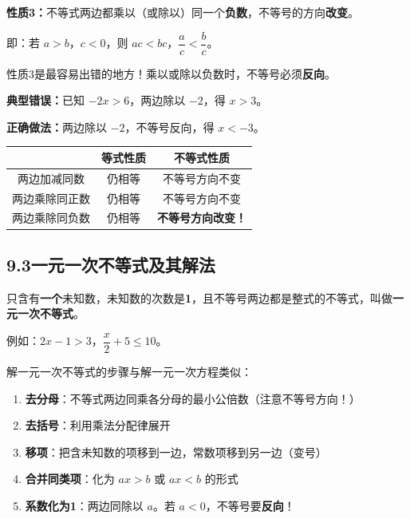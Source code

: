 \documentclass[12pt, a4paper]{ctexart}
\begin{document}
\begin{knowledgebox}[9.2.3 不等式的基本性质3]
\textbf{性质3：}不等式两边都乘以（或除以）同一个\textbf{负数}，不等号的方向\textbf{改变}。

即：若 $a > b$，$c < 0$，则 $ac < bc$，$\dfrac{a}{c} < \dfrac{b}{c}$。
\end{knowledgebox}

\begin{warnbox}[易错提醒：性质3]
性质3是最容易出错的地方！乘以或除以负数时，不等号必须\textbf{反向}。

\textbf{典型错误：}已知 $-2x > 6$，两边除以 $-2$，得 $x > 3$。

\textbf{正确做法：}两边除以 $-2$，不等号反向，得 $x < -3$。
\end{warnbox}

\begin{tipbox}[不等式性质与等式性质的对比]
\renewcommand{\arraystretch}{1.3}
\begin{center}
\begin{tabular}{|c|c|c|}
\hline
 & \textbf{等式性质} & \textbf{不等式性质} \\
\hline
两边加减同数 & 仍相等 & 不等号方向不变 \\
\hline
两边乘除同正数 & 仍相等 & 不等号方向不变 \\
\hline
两边乘除同负数 & 仍相等 & \textbf{不等号方向改变！} \\
\hline
\end{tabular}
\end{center}
\end{tipbox}

\subsection*{9.3\quad 一元一次不等式及其解法}

\begin{knowledgebox}[9.3.1 一元一次不等式]
只含有\textbf{一个}未知数，未知数的次数是\textbf{1}，且不等号两边都是整式的不等式，叫做\textbf{一元一次不等式}。

例如：$2x - 1 > 3$，$\dfrac{x}{2} + 5 \leqslant 10$。
\end{knowledgebox}

\begin{knowledgebox}[9.3.2 一元一次不等式的解法步骤]
解一元一次不等式的步骤与解一元一次方程类似：
\begin{enumerate}[leftmargin=2em]
  \item \textbf{去分母}：不等式两边同乘各分母的最小公倍数（注意不等号方向！）
  \item \textbf{去括号}：利用乘法分配律展开
  \item \textbf{移项}：把含未知数的项移到一边，常数项移到另一边（变号）
  \item \textbf{合并同类项}：化为 $ax > b$ 或 $ax < b$ 的形式
  \item \textbf{系数化为1}：两边同除以 $a$。若 $a < 0$，不等号要\textbf{反向}！
\end{enumerate}
\end{knowledgebox}
\end{document}

